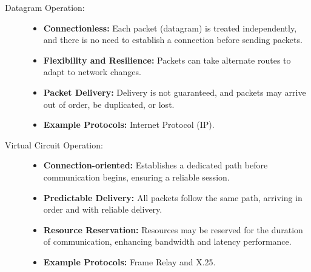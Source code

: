 \documentclass{article}
\begin{document}
\begin{description}
    \item[Datagram Operation:] 
    \begin{itemize}
        \item \textbf{Connectionless:} Each packet (datagram) is treated independently, and there is no need to establish a connection before sending packets.
        \item \textbf{Flexibility and Resilience:} Packets can take alternate routes to adapt to network changes.
        \item \textbf{Packet Delivery:} Delivery is not guaranteed, and packets may arrive out of order, be duplicated, or lost.
        \item \textbf{Example Protocols:} Internet Protocol (IP).
    \end{itemize}

    \item[Virtual Circuit Operation:]
    \begin{itemize}
        \item \textbf{Connection-oriented:} Establishes a dedicated path before communication begins, ensuring a reliable session.
        \item \textbf{Predictable Delivery:} All packets follow the same path, arriving in order and with reliable delivery.
        \item \textbf{Resource Reservation:} Resources may be reserved for the duration of communication, enhancing bandwidth and latency performance.
        \item \textbf{Example Protocols:} Frame Relay and X.25.
    \end{itemize}
\end{description}
\end{document}
